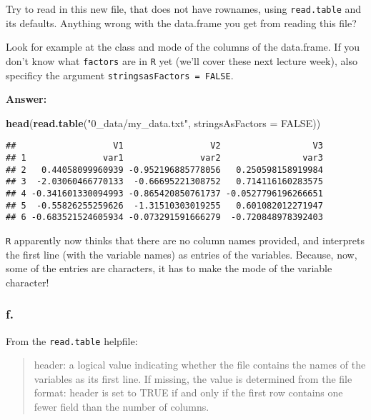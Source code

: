 \documentclass[]{article}
\newenvironment{Shaded}{\begin{snugshade}}{\end{snugshade}}
\newcommand{\DataTypeTok}[1]{\textcolor[rgb]{0.13,0.29,0.53}{#1}}
\newcommand{\KeywordTok}[1]{\textcolor[rgb]{0.13,0.29,0.53}{\textbf{#1}}}
\newcommand{\NormalTok}[1]{#1}
\newcommand{\OtherTok}[1]{\textcolor[rgb]{0.56,0.35,0.01}{#1}}
\newcommand{\StringTok}[1]{\textcolor[rgb]{0.31,0.60,0.02}{#1}}
\begin{document}
Try to read in this new file, that does not have rownames, using
\texttt{read.table} and its defaults. Anything wrong with the data.frame
you get from reading this file?

Look for example at the class and mode of the columns of the data.frame.
If you don't know what \texttt{factors} are in \texttt{R} yet (we'll
cover these next lecture week), also specificy the argument
\texttt{stringsasFactors\ =\ FALSE}.

\textbf{Answer:}

\begin{Shaded}
\begin{Highlighting}[]
\KeywordTok{head}\NormalTok{(}\KeywordTok{read.table}\NormalTok{(}\StringTok{"0_data/my_data.txt"}\NormalTok{, }\DataTypeTok{stringsAsFactors =} \OtherTok{FALSE}\NormalTok{))}
\end{Highlighting}
\end{Shaded}

\begin{verbatim}
##                   V1                 V2                  V3
## 1               var1               var2                var3
## 2   0.44058099960939 -0.952196885778056   0.250598158919984
## 3  -2.03060466770133  -0.66695221308752   0.714116160283575
## 4 -0.341601330094993 -0.865420850761737 -0.0527796196266651
## 5  -0.55826255259626  -1.31510303019255   0.601082012271947
## 6 -0.683521524605934 -0.073291591666279  -0.720848978392403
\end{verbatim}

\texttt{R} apparently now thinks that there are no column names
provided, and interprets the first line (with the variable names) as
entries of the variables. Because, now, some of the entries are
characters, it has to make the mode of the variable character!

\hypertarget{f.-2}{%
\subsubsection{f.}\label{f.-2}}

From the \texttt{read.table} helpfile:

\begin{quote}
header: a logical value indicating whether the file contains the names
of the variables as its first line. If missing, the value is determined
from the file format: header is set to TRUE if and only if the first row
contains one fewer field than the number of columns.
\end{quote}
\end{document}
